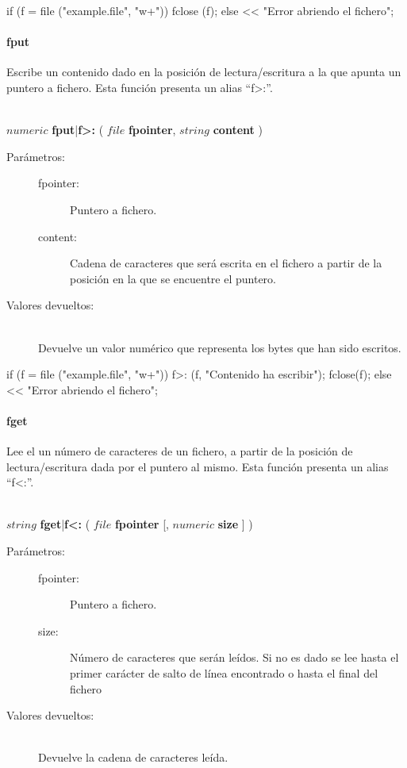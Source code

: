 \begin{myverbatim}  
   if (f = file ("example.file", "w+")){
      fclose (f); 
   } else {
      << "Error abriendo el fichero";
   }
\end{myverbatim}

\paragraph{fput}
Escribe un contenido dado en la posición de lectura/escritura a la que apunta un puntero a fichero. Esta función presenta un alias ``f>:''.
\begin{framed}
\hfill \\ $numeric$ \textbf{fput}|\textbf{f>:} ( $file$ \textbf{fpointer}, $string$ \textbf{content}  )  
\begin{description}
\item [Parámetros:] \hfill 
   \begin{description}
   \item[fpointer:] Puntero a fichero. 
   \item[content:] Cadena de caracteres que será escrita en el fichero a partir de la posición en la que se encuentre el puntero. 
   \end{description}
\item[Valores devueltos:] \hfill \\
   Devuelve un valor numérico que representa los bytes que han sido escritos.
\end{description}
\end{framed}

\begin{myverbatim}  
   if (f = file ("example.file", "w+")){
      f>: (f, "Contenido ha escribir"); 
      fclose(f);
   } else {
      << "Error abriendo el fichero";
   }
\end{myverbatim}

\paragraph{fget}
Lee el un número de caracteres de un fichero, a partir de la posición de lectura/escritura dada por el puntero al mismo. Esta función presenta un alias ``f<:''.

\begin{framed}
\hfill \\ $string$ \textbf{fget}|\textbf{f<:} ( $file$ \textbf{fpointer} [, $numeric$ \textbf{size} ]  )  
\begin{description}
\item [Parámetros:] \hfill 
   \begin{description}
   \item[fpointer:] Puntero a fichero. 
   \item[size:] Número de caracteres que serán leídos. Si no es dado se lee hasta el primer carácter de salto de línea encontrado o hasta el final del fichero 
   \end{description}
\item[Valores devueltos:] \hfill \\
   Devuelve la cadena de caracteres leída.
\end{description}
\end{framed}

